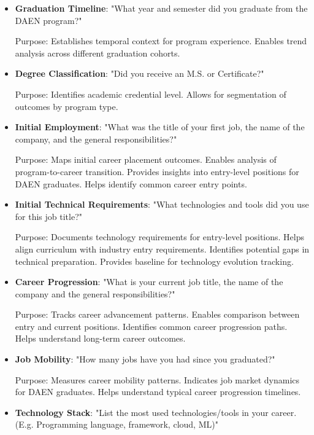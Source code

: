 \documentclass[12pt,a4paper]{article}
\begin{document}
\begin{itemize}
\item \textbf{Graduation Timeline}: "What year and semester did you graduate from the DAEN program?"

Purpose: Establishes temporal context for program experience. Enables trend analysis across different graduation cohorts.

\item \textbf{Degree Classification}: "Did you receive an M.S. or Certificate?"

Purpose: Identifies academic credential level. Allows for segmentation of outcomes by program type.

\item \textbf{Initial Employment}: "What was the title of your first job, the name of the company, and the general responsibilities?"

Purpose: Maps initial career placement outcomes. Enables analysis of program-to-career transition. Provides insights into entry-level positions for DAEN graduates. Helps identify common career entry points.


\item \textbf{Initial Technical Requirements}: "What technologies and tools did you use for this job title?"

Purpose: Documents technology requirements for entry-level positions. Helps align curriculum with industry entry requirements. Identifies potential gaps in technical preparation. Provides baseline for technology evolution tracking.


\item \textbf{Career Progression}: "What is your current job title, the name of the company and the general responsibilities?"

Purpose: Tracks career advancement patterns. Enables comparison between entry and current positions. Identifies common career progression paths. Helps understand long-term career outcomes.


\item \textbf{Job Mobility}: "How many jobs have you had since you graduated?"

Purpose: Measures career mobility patterns. Indicates job market dynamics for DAEN graduates. Helps understand typical career progression timelines.

\item \textbf{Technology Stack}: "List the most used technologies/tools in your career. (E.g. Programming language, framework, cloud, ML)"


\end{itemize}
\end{document}

